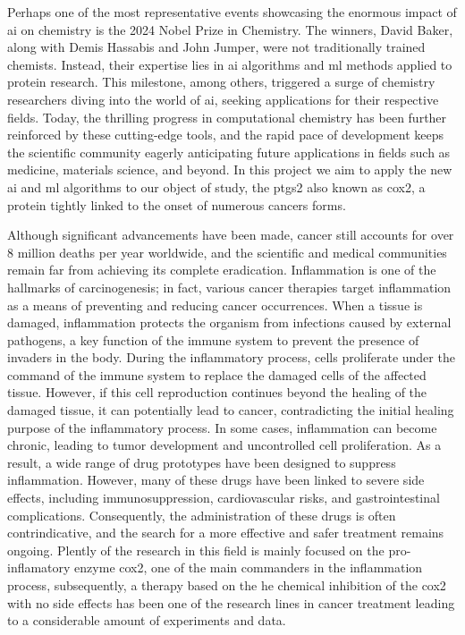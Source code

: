 \documentclass[11pt]{article}
\begin{document}
Perhaps one of the most representative events showcasing the enormous impact of \gls{ai} on chemistry is the 2024 Nobel Prize in Chemistry. The winners, David Baker\cite{NobelPrizeBale}, along with Demis Hassabis and John Jumper\cite{NobelPrizeJumper}, were not traditionally trained chemists. Instead, their expertise lies in \gls{ai} algorithms and \gls{ml} methods applied to protein research. This milestone, among others, triggered a surge of chemistry researchers diving into the world of \gls{ai}, seeking applications for their respective fields. Today, the thrilling progress in computational chemistry has been further reinforced by these cutting-edge tools\cite{MachineLearningPaper5Lipoxygenase}, and the rapid pace of development keeps the scientific community eagerly anticipating future applications in fields such as medicine, materials science, and beyond. In this project we aim to apply the new \gls{ai} and \gls{ml} algorithms to our object of study, the \gls{ptgs2} also known as \gls{cox2}, a protein tightly linked to the onset of numerous cancers forms\cite{Cox2CancerReview}. 

Although significant advancements have been made, cancer still accounts for over 8 million deaths per year worldwide, and the scientific and medical communities remain far from achieving its complete eradication. Inflammation is one of the hallmarks of carcinogenesis; in fact, various cancer therapies target inflammation as a means of preventing and reducing cancer occurrences. When a tissue is damaged, inflammation protects the organism from infections caused by external pathogens, a key function of the immune system to prevent the presence of invaders in the body. During the inflammatory process, cells proliferate under the command of the immune system to replace the damaged cells of the affected tissue. However, if this cell reproduction continues beyond the healing of the damaged tissue, it can potentially lead to cancer, contradicting the initial healing purpose of the inflammatory process. In some cases, inflammation can become chronic, leading to tumor development and uncontrolled cell proliferation. As a result, a wide range of drug prototypes have been designed to suppress inflammation. However, many of these drugs have been linked to severe side effects, including immunosuppression, cardiovascular risks, and gastrointestinal complications. Consequently, the administration of these drugs is often contrindicative, and the search for a more effective and safer treatment remains ongoing. Plently of the research in this field is mainly focused on the pro-inflamatory enzyme \gls{cox2}, one of the main commanders in the inflammation process, subsequently, a therapy based on the he chemical inhibition of the \gls{cox2} with no side effects has been one of the research lines in cancer treatment leading to a considerable amount of experiments and data.
\end{document}
